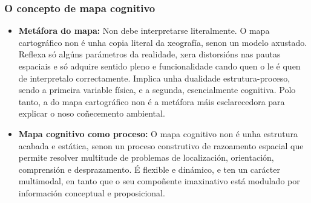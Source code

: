 \documentclass[a4paper,11pt]{article}
\begin{document}
\subsubsection{O concepto de mapa cognitivo}
\begin{itemize}
	\item \textbf{Metáfora do mapa:} Non debe interpretarse literalmente. O mapa cartográfico non é 
	unha copia literal da xeografía, senon un modelo axustado. Reflexa só algúns parámetros da 
	realidade, xera distorsións nas pautas espaciais e só adquire sentido pleno e funcionalidade 
	cando quen o le é quen de interpretalo correctamente. Implica unha dualidade estrutura-proceso, 
	sendo a primeira variable física, e a segunda, esencialmente cognitiva. Polo tanto, a do mapa 
	cartográfico non é a metáfora máis esclarecedora para explicar o noso coñecemento ambiental.
	\item \textbf{Mapa cognitivo como proceso:} O mapa cognitivo non é unha estrutura acabada e 
	estática, senon un proceso construtivo de razoamento espacial que permite resolver multitude de 
	problemas de localización, orientación, comprensión e desprazamento. É flexible e dinámico, e 
	ten un carácter multimodal, en tanto que o seu compoñente imaxinativo está modulado por 
	información conceptual e proposicional.
\end{itemize}
\end{document}
